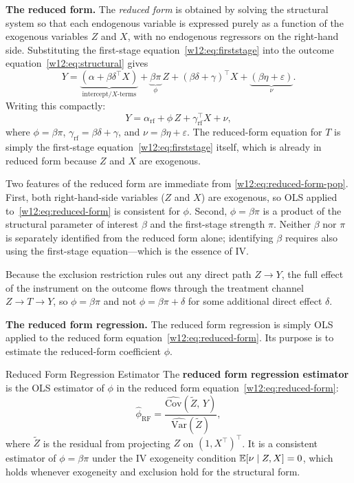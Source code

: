 \documentclass[master.tex]{subfiles}
\begin{document}
\medskip\noindent\textbf{The reduced form.}
The \emph{reduced form} is obtained by solving the structural system
so that each endogenous variable is expressed purely as a function
of the exogenous variables $Z$ and $X$, with no endogenous
regressors on the right-hand side.  Substituting the first-stage
equation~\eqref{w12:eq:firststage} into the outcome
equation~\eqref{w12:eq:structural} gives
\begin{equation}
  Y = \underbrace{(\alpha + \beta\delta^\top X)}_{\text{intercept/}X\text{-terms}}
    + \underbrace{\beta\pi}_{\phi}\, Z
    + (\beta\delta + \gamma)^\top X
    + \underbrace{(\beta\eta + \varepsilon)}_{\nu}.
  \label{w12:eq:reduced-form-pop}
\end{equation}
Writing this compactly:
\begin{equation}
  Y = \alpha_{\mathrm{rf}} + \phi\, Z
    + \gamma_{\mathrm{rf}}^\top X + \nu,
  \label{w12:eq:reduced-form}
\end{equation}
where $\phi = \beta\pi$, $\gamma_{\mathrm{rf}} = \beta\delta + \gamma$,
and $\nu = \beta\eta + \varepsilon$.  The reduced-form equation for
$T$ is simply the first-stage equation~\eqref{w12:eq:firststage}
itself, which is already in reduced form because $Z$ and $X$ are
exogenous.

Two features of the reduced form are immediate from
\eqref{w12:eq:reduced-form-pop}.  First, both right-hand-side
variables ($Z$ and $X$) are exogenous, so OLS applied
to~\eqref{w12:eq:reduced-form} is consistent for $\phi$.  Second,
$\phi = \beta\pi$ is a product of the structural parameter of
interest $\beta$ and the first-stage strength $\pi$.  Neither
$\beta$ nor $\pi$ is separately identified from the reduced form
alone; identifying $\beta$ requires also using the first-stage
equation---which is the essence of IV.

Because the exclusion restriction rules out any direct path
$Z \to Y$, the full effect of the instrument on the outcome flows
through the treatment channel $Z \to T \to Y$, so $\phi = \beta\pi$
and not $\phi = \beta\pi + \delta$ for some additional direct
effect $\delta$.

\medskip\noindent\textbf{The reduced form regression.}
The reduced form regression is simply OLS applied to the reduced
form equation~\eqref{w12:eq:reduced-form}.  Its purpose is to
estimate the reduced-form coefficient $\phi$.

\begin{defn}{Reduced Form Regression Estimator}
\label{w12:defn:reduced-form}
The \textbf{reduced form regression estimator} is the OLS estimator
of $\phi$ in the reduced form equation~\eqref{w12:eq:reduced-form}:
\begin{equation}
  \hat\phi_{\mathrm{RF}}
  = \frac{\widehat{\mathrm{Cov}}(\tilde{Z},\, Y)}
         {\widehat{\mathrm{Var}}(\tilde{Z})},
  \label{w12:eq:rf-est}
\end{equation}
where $\tilde{Z}$ is the residual from projecting $Z$ on
$(1, X^\top)^\top$.  It is a consistent estimator of
$\phi = \beta\pi$ under the IV exogeneity condition
$\mathbb{E}[\nu \mid Z, X] = 0$, which holds whenever exogeneity and
exclusion hold for the structural form.
\end{defn}
\end{document}
